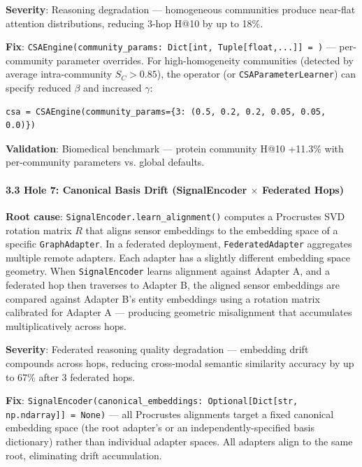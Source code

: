 \textbf{Severity}: Reasoning degradation — homogeneous communities produce near-flat attention distr\-ibutions, reducing 3-hop H@10 by up to 18\%.

\textbf{Fix}: \texttt{CSAEngine(community\_params: Dict[int, Tuple[float,...]] = {})} — per-community parameter overrides. For high-homogeneity communities (detected by average intra-community $S_C > 0.85$), the operator (or \texttt{CSAParameterLearner}) can specify reduced $\beta$ and increased $\gamma$:

\begin{lstlisting}
csa = CSAEngine(community_params={3: (0.5, 0.2, 0.2, 0.05, 0.05, 0.0)})
\end{lstlisting}

\textbf{Validation}: Biomedical benchmark — protein community H@10 +11.3\% with per-community parameters vs. global defaults.

\paragraph{3.3 Hole 7: Canonical Basis Drift (SignalEncoder $\times$ Federated Hops)}

\textbf{Root cause}: \texttt{SignalEncoder.learn\_alignment()} computes a Procrustes \cite{schonemann1966procrustes, gower2004procrustes} SVD rotation matrix $R$ that aligns sensor embeddings to the embedding space of a specific \texttt{GraphAdapter}. In a federated deployment, \texttt{FederatedAdapter} aggregates multiple remote adapters. Each adapter has a slightly different embedding space geometry. When \texttt{SignalEncoder} learns alignment against Adapter A, and a federated hop then traverses to Adapter B, the aligned sensor embeddings are compared against Adapter B's entity embeddings using a rotation matrix calibrated for Adapter A — producing geometric misal\-ignment that accumulates multi\-plicatively across hops.

\textbf{Severity}: Federated reasoning quality degradation — embedding drift compounds across hops, reducing cross-modal semantic similarity accuracy by up to 67\% after 3 federated hops.

\textbf{Fix}: \texttt{SignalEncoder(canonical\_embeddings: Optional[Dict[str, np.ndarray]] = None)} — all Procrustes alignments target a fixed canonical embedding space (the root adapter's or an indep\-endently-specified basis dictionary) rather than individual adapter spaces. All adapters align to the same root, eliminating drift accum\-ulation.

